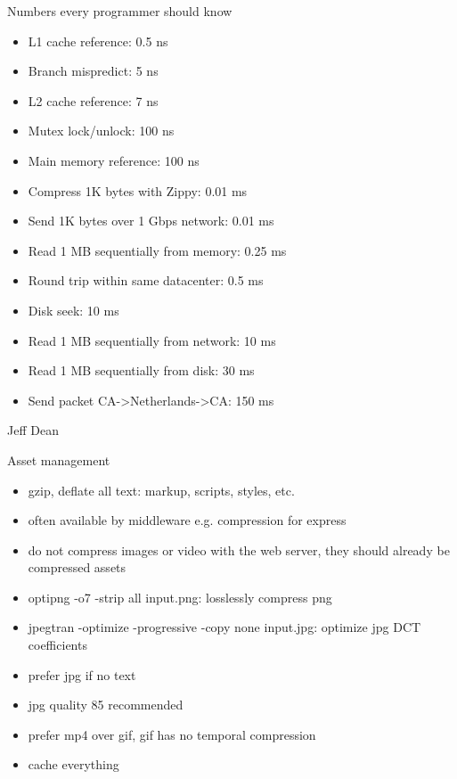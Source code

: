 \documentclass{beamer}
\begin{document}
\begin{frame}{Numbers every programmer should know}
  \begin{itemize}
    \item L1 cache reference: 0.5 ns
    \item Branch mispredict: 5 ns
    \item L2 cache reference: 7 ns
    \item Mutex lock/unlock: 100 ns
    \item Main memory reference: 100 ns
    \item Compress 1K bytes with Zippy: 0.01 ms
    \item Send 1K bytes over 1 Gbps network: 0.01 ms
    \item Read 1 MB sequentially from memory: 0.25 ms
    \item Round trip within same datacenter: 0.5 ms
    \item Disk seek: 10 ms
    \item Read 1 MB sequentially from network: 10 ms
    \item Read 1 MB sequentially from disk: 30 ms
    \item Send packet CA->Netherlands->CA: 150 ms
  \end{itemize}
  Jeff Dean
\end{frame}

\begin{frame}{Asset management}
  \begin{itemize}
    \item gzip, deflate all text: markup, scripts, styles, etc.
    \item often available by middleware e.g. compression for express
    \item do not compress images or video with the web server, they should
      already be compressed assets
    \item optipng -o7 -strip all input.png: losslessly compress png
    \item jpegtran -optimize -progressive -copy none input.jpg: optimize jpg
      DCT coefficients
    \item prefer jpg if no text
    \item jpg quality 85 recommended
    \item prefer mp4 over gif, gif has no temporal compression
    \item cache everything
  \end{itemize}
\end{frame}
\end{document}

